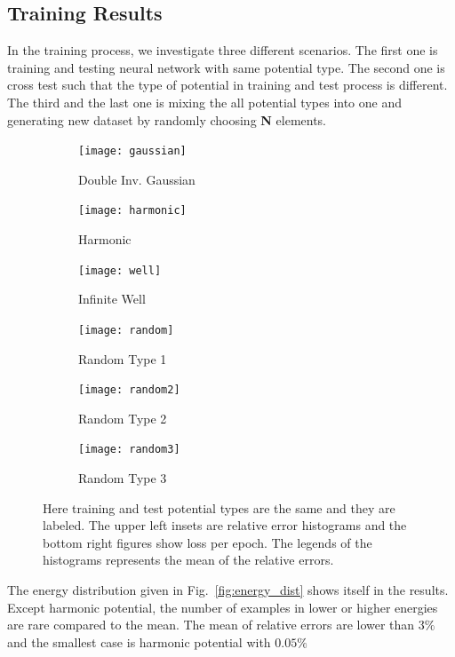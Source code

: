 \documentclass[a4paper,times,hidelinks,12pt]{article}
\begin{document}
\subsection{Training Results}
\label{sec:training_results}

In the training process, we investigate three different scenarios. The first one is training and testing neural network with same potential type. The second one is cross test such that the type of potential in training and test process is different. The third and the last one is mixing the all potential types into one and generating new dataset by randomly choosing \textbf{N} elements.

\graphicspath{{"../figs/training/"}}
\begin{figure}[H]
    \centering
    \begin{subfigure}[t]{0.49\textwidth}
        \texttt{[image: gaussian]}
    \caption{Double Inv. Gaussian}
    \end{subfigure}
    \begin{subfigure}[t]{0.49\textwidth}
        \texttt{[image: harmonic]}
    \caption{Harmonic}
    \end{subfigure}
    \begin{subfigure}[t]{0.49\textwidth}
        \texttt{[image: well]}
        \caption{Infinite Well}
    \end{subfigure}
    \begin{subfigure}[t]{0.49\textwidth}
        \texttt{[image: random]}
        \caption{Random Type 1}
    \end{subfigure}
    \begin{subfigure}[t]{0.49\textwidth}
        \texttt{[image: random2]}
        \caption{Random Type 2}
    \end{subfigure}
    \begin{subfigure}[t]{0.49\textwidth}
        \texttt{[image: random3]}
        \caption{Random Type 3}
    \end{subfigure}
\caption{Here training and test potential types are the same and they are labeled. The upper left insets are relative error histograms and the bottom right figures show loss per epoch. The legends of the histograms represents the mean of the relative errors.}
\label{fig:training_results}
\end{figure}

The energy distribution given in Fig.~\ref{fig:energy_dist} shows itself in the results. Except harmonic potential, the number of examples in lower or higher energies are rare compared to the mean. The mean of relative errors are lower than $3\%$ and the smallest case is harmonic potential with $0.05\%$
\end{document}

